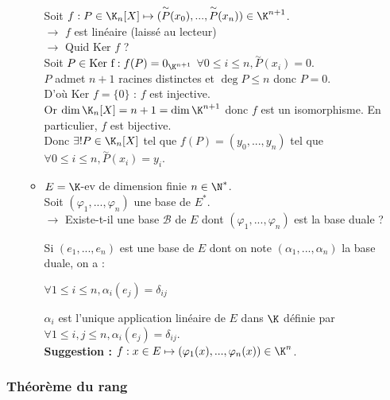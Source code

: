 \documentclass[12pt, a4paper]{report}
\begin{document}
\begin{enumerate}
\begin{exemple}{}
\begin{itemize}
		Soit $f : P \in \K_n[X] \mapsto (\overset{\sim}{P}(x_0),...,\overset{\sim}{P}(x_n)) \in \K^{n+1}$. \\
		$\longrightarrow$ $f$ est linéaire (laissé au lecteur) \\
		$\longrightarrow$ Quid $\text{Ker } f$ ? \\
		Soit $P \in \text{Ker f} : f(P) = 0_{\K^{n+1}}$ \ie $\forall 0 \le i \le n, \overset{\sim}{P}(x_i) = 0$. \\
		$P$ admet $n+1$ racines distinctes et $\deg P \le n$ donc $P = 0$. \\
		D'où $\text{Ker }f = \{0\}$ : $f$ est injective. \\
		
		Or $\dim \K_n[X] = n+1 = \dim \K^{n+1}$ donc $f$ est un isomorphisme. En particulier, $f$ est bijective. \\
		Donc $\exists ! P \in \K_n[X]$ tel que $f(P) = (y_0,...,y_n)$ \ie tel que $\forall 0 \le i \le n, \overset{\sim}{P}(x_i) = y_i$.
		
		\item $E = \K$-ev de dimension finie $n \in \N^*$. \\
		Soit $(\varphi_1,...,\varphi_n)$ une base de $E^*$. \\
		$\longrightarrow$ Existe-t-il une base $\mathcal{B}$ de $E$ dont $(\varphi_1,...,\varphi_n)$ est la base duale ?
		
		\begin{remarque}{}
		Si $(e_1,...,e_n)$ est une base de $E$ dont on note $(\alpha_1,...,\alpha_n)$ la base duale, on a :
		\begin{center}
		$\forall 1 \le i \le n, \alpha_i(e_j) = \delta_{ij}$
		\end{center}
		$\alpha_i$ est l'unique application linéaire de $E$ dans $\K$ définie par $\forall 1 \le i,j \le n, \alpha_i(e_j) = \delta_{ij}$. \\
		\textbf{Suggestion :} $f : x \in E \mapsto (\varphi_1(x),...,\varphi_n(x)) \in \K^n$.
		\end{remarque}
		
	\end{itemize}
	\end{exemple}

\end{enumerate}

\subsubsection{Théorème du rang}
\end{document}
